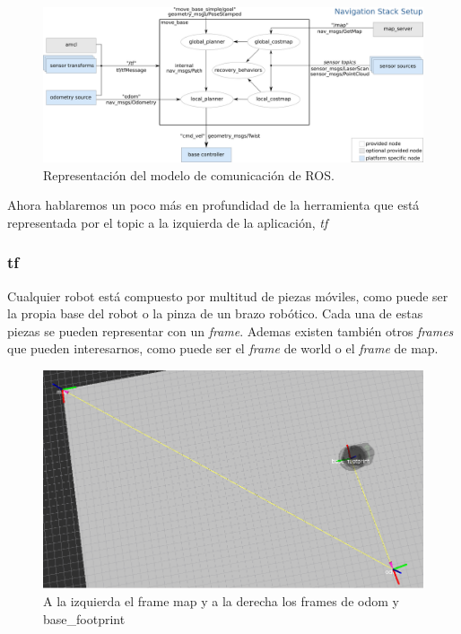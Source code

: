 \begin{figure} [H]
  \begin{center}
    \includegraphics[width=16cm]{img/cap3/navigationstack}
  \end{center}
  \caption{Representación del modelo de comunicación de ROS.}
  \label{fig:modelocomunicacion}
\end{figure}

Ahora hablaremos un poco más en profundidad de la herramienta que está representada por el topic a la izquierda de la aplicación, \textit{tf}

\subsubsection{tf}
\label{subsubsec:tf}
Cualquier robot está compuesto por multitud de piezas móviles, como puede ser la propia base del robot o la pinza de un brazo robótico. Cada una de estas piezas se pueden representar con un \textit{frame}. Ademas existen también otros \textit{frames} que pueden interesarnos, como puede ser el \textit{frame} de world o el \textit{frame} de map.
\begin{figure} [hbtp]
  \begin{center}
    \includegraphics[width=12cm]{img/cap3/frames}
  \end{center}
  \caption{A la izquierda el frame map y a la derecha los frames de odom y base\_footprint}
  \label{fig:frames}
\end{figure}

